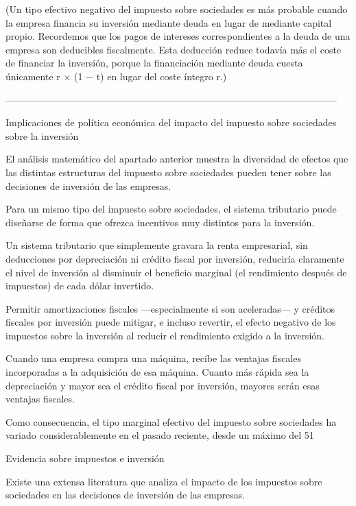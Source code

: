 \documentclass[10pt,a4paper]{article}
\begin{document}
(Un tipo efectivo negativo del impuesto sobre sociedades es más probable cuando la empresa financia su inversión mediante deuda en lugar de mediante capital propio. Recordemos que los pagos de intereses correspondientes a la deuda de una empresa son deducibles fiscalmente. Esta deducción reduce todavía más el coste de financiar la inversión, porque la financiación mediante deuda cuesta únicamente r × (1 − t) en lugar del coste íntegro r.)



--------------------------------------------------------------------------------------------------------



Implicaciones de política económica del impacto del impuesto sobre sociedades sobre la inversión

El análisis matemático del apartado anterior muestra la diversidad de efectos que las distintas estructuras del impuesto sobre sociedades pueden tener sobre las decisiones de inversión de las empresas.

Para un mismo tipo del impuesto sobre sociedades, el sistema tributario puede diseñarse de forma que ofrezca incentivos muy distintos para la inversión.

Un sistema tributario que simplemente gravara la renta empresarial, sin deducciones por depreciación ni crédito fiscal por inversión, reduciría claramente el nivel de inversión al disminuir el beneficio marginal (el rendimiento después de impuestos) de cada dólar invertido.

Permitir amortizaciones fiscales —especialmente si son aceleradas— y créditos fiscales por inversión puede mitigar, e incluso revertir, el efecto negativo de los impuestos sobre la inversión al reducir el rendimiento exigido a la inversión.

Cuando una empresa compra una máquina, recibe las ventajas fiscales incorporadas a la adquisición de esa máquina. Cuanto más rápida sea la depreciación y mayor sea el crédito fiscal por inversión, mayores serán esas ventajas fiscales.

Como consecuencia, el tipo marginal efectivo del impuesto sobre sociedades ha variado considerablemente en el pasado reciente, desde un máximo del 51 %

Evidencia sobre impuestos e inversión

Existe una extensa literatura que analiza el impacto de los impuestos sobre sociedades en las decisiones de inversión de las empresas.
\end{document}
